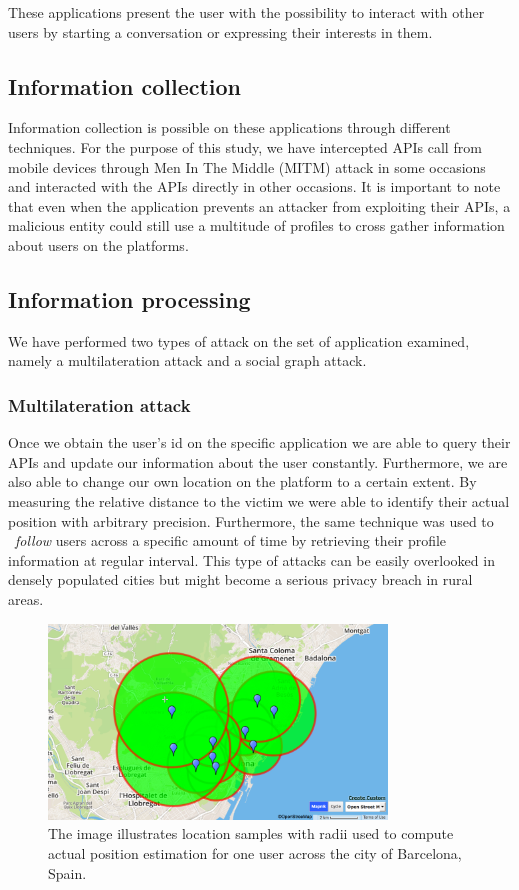 These applications present the user with the possibility to interact with other users by starting a conversation or expressing their interests in them.

\subsection{Information collection}
\noindent
Information collection is possible on these applications through different techniques. For the purpose of this study, we have intercepted APIs call from mobile devices through Men In The Middle (MITM) attack in some occasions and interacted with the APIs directly in other occasions.
\noindent
It is important to note that even when the application prevents an attacker from exploiting their APIs, a malicious entity could still use a multitude of profiles to cross gather information about users on the platforms.

\subsection{Information processing}
\noindent
We have performed two types of attack on the set of application examined, namely a multilateration attack and a social graph attack.

\subsubsection{Multilateration attack}
\noindent
Once we obtain the user's id on the specific application we are able to query their APIs and update our information about the user constantly. Furthermore, we are also able to change our own location on the platform to a certain extent.
\noindent
By measuring the relative distance to the victim we were able to identify their actual position with arbitrary precision. Furthermore, the same technique was used to ~\emph{follow} users across a specific amount of time by retrieving their profile information at regular interval.
\noindent
This type of attacks can be easily overlooked in densely populated cities but might become a serious privacy breach in rural areas.

\begin{figure}[t]
\centering
\includegraphics[width=90mm]{figures/user_mlat.jpg}
\caption[Location samples for a single user.]{The image illustrates location samples with radii used to compute actual position estimation for one user across the city of Barcelona, Spain.}
\label{fig:mlat}
\end{figure}

